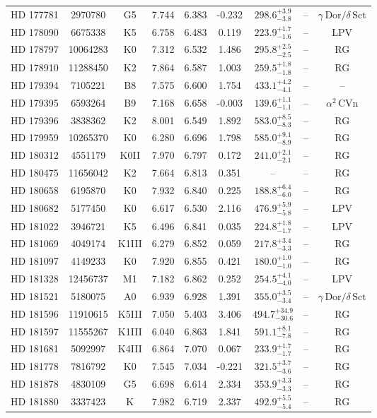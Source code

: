 \begin{table*}
\begin{tabular}{ccccccccc}
HD 177781 & 2970780 & G5 & 7.744 & 6.383 & -0.232 & $298.6^{+3.9}_{-3.8}$ & -- & $\gamma\,\text{Dor} /\delta\,\text{Sct}$ \\
HD 178090 & 6675338 & K5 & 6.758 & 6.483 & 0.119 & $223.9^{+1.7}_{-1.6}$ & -- & LPV \\
HD 178797 & 10064283 & K0 & 7.312 & 6.532 & 1.486 & $295.8^{+2.5}_{-2.5}$ & -- & RG \\
HD 178910 & 11288450 & K2 & 7.864 & 6.587 & 1.003 & $259.5^{+1.8}_{-1.8}$ & -- & RG \\
HD 179394 & 7105221 & B8 & 7.575 & 6.600 & 1.754 & $433.1^{+4.2}_{-4.1}$ & -- & -- \\
HD 179395 & 6593264 & B9 & 7.168 & 6.658 & -0.003 & $139.6^{+1.1}_{-1.1}$ & -- & $\alpha^2\,\text{CVn}$ \\
HD 179396 & 3838362 & K2 & 8.001 & 6.549 & 1.892 & $583.0^{+8.5}_{-8.3}$ & -- & RG \\
HD 179959 & 10265370 & K0 & 6.280 & 6.696 & 1.798 & $585.0^{+9.1}_{-8.9}$ & -- & RG \\
HD 180312 & 4551179 & K0II & 7.970 & 6.797 & 0.172 & $241.0^{+2.1}_{-2.1}$ & -- & RG \\
HD 180475 & 11656042 & K2 & 7.664 & 6.813 & 0.351 & -- & -- & RG \\
HD 180658 & 6195870 & K0 & 7.932 & 6.840 & 0.225 & $188.8^{+6.4}_{-6.0}$ & -- & RG \\
HD 180682 & 5177450 & K0 & 6.617 & 6.530 & 2.116 & $476.9^{+5.9}_{-5.8}$ & -- & LPV \\
HD 181022 & 3946721 & K5 & 6.496 & 6.841 & 0.035 & $224.8^{+1.8}_{-1.7}$ & -- & LPV \\
HD 181069 & 4049174 & K1III & 6.279 & 6.852 & 0.059 & $217.8^{+3.4}_{-3.3}$ & -- & RG \\
HD 181097 & 4149233 & K0 & 7.920 & 6.855 & 0.421 & $180.0^{+1.0}_{-1.0}$ & -- & RG \\
HD 181328 & 12456737 & M1 & 7.182 & 6.862 & 0.252 & $254.5^{+4.1}_{-4.0}$ & -- & LPV \\
HD 181521 & 5180075 & A0 & 6.939 & 6.928 & 1.391 & $355.0^{+3.5}_{-3.4}$ & -- & $\gamma\,\text{Dor} /\delta\,\text{Sct}$ \\
HD 181596 & 11910615 & K5III & 7.050 & 5.403 & 3.406 & $494.7^{+34.9}_{-30.6}$ & -- & RG \\
HD 181597 & 11555267 & K1III & 6.040 & 6.863 & 1.841 & $591.1^{+8.1}_{-7.8}$ & -- & RG \\
HD 181681 & 5092997 & K4III & 6.864 & 7.070 & 0.067 & $233.9^{+1.7}_{-1.7}$ & -- & RG \\
HD 181778 & 7816792 & K0 & 7.545 & 7.034 & -0.221 & $321.5^{+3.7}_{-3.6}$ & -- & RG \\
HD 181878 & 4830109 & G5 & 6.698 & 6.614 & 2.334 & $353.9^{+3.3}_{-3.3}$ & -- & RG \\
HD 181880 & 3337423 & K & 7.982 & 6.719 & 2.337 & $492.9^{+5.5}_{-5.4}$ & -- & RG \\
\hline
\end{tabular}
\end{table*}
